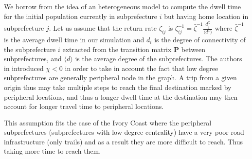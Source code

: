 \documentclass[review]{elsarticle}
\begin{document}
\begin{definition}\label{returnProba}
We borrow from \cite{polettoheterogeneous2012} the idea of an heterogeneous model to compute the dwell time for the initial population currently in subprefecture $i$ but having home location in subprefecture $j$. Let us assume that the return rate $\zeta_{ij}$ is $\zeta_{ij}^{-1} = \bar{\zeta}^{-1} \frac{d_{j}^{\chi}}{\langle d^{\chi}\rangle}$ where $\bar{\zeta}^{-1}$ is the average dwell time in our simulation and $d_i$ is the degree of connectivity of the subprefecture $i$ extracted from the transition matrix $\mathbf{P}$ between subprefectures, and $\langle d \rangle$ is the average degree of the subprefectures. The authors in \cite{polettoheterogeneous2012} introduced $\chi < 0$ in order to take in account the fact that low degree subprefectures are generally peripheral node in the graph. A trip from a given origin thus may take multiple steps to reach the final destination marked by peripheral locations, and thus a longer dwell time at the destination may then account for longer travel time to peripheral locations.
\end{definition}
This assumption fits the case of the Ivory Coast where the peripheral subprefectures (subprefectures with low degree centrality) have a very poor road infrastructure (only trails) and as a result they are more difficult to reach. Thus taking more time to reach them.
\end{document}
